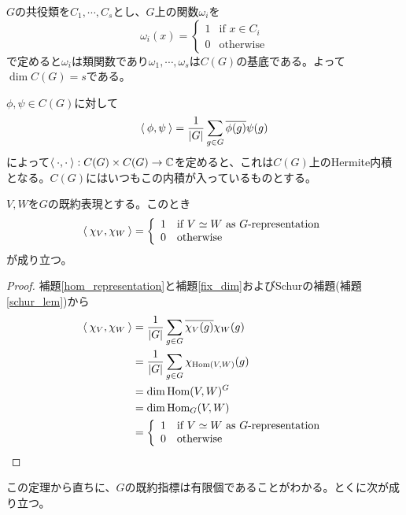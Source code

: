 \documentclass{ltjsreport}
\begin{document}
\begin{eg}
  $G$の共役類を$C_1,\cdots,C_s$とし、$G$上の関数$\omega_i$を
  \[
  \omega_i(x)=\left\{\begin{array}{cl}
    1 & \text{if $x\in C_i$}\\
    0 & \text{otherwise}
  \end{array}\right.  
  \]
  で定めると$\omega_i$は類関数であり$\omega_1,\cdots,\omega_s$は$C(G)$の基底である。よって$\dim C(G)=s$である。
\end{eg}

\begin{defin}
  $\phi,\psi\in C(G)$に対して
  \[
  \langle\:\phi,\psi\:\rangle=\frac{1}{|G|}\sum_{g\in G}\overline{\phi(g)}\psi(g)  
  \]
  によって$\langle\:\cdot,\cdot\:\rangle:C(G)\times C(G)\rightarrow \mathbb{C}$を定めると、これは$C(G)$上のHermite内積となる。$C(G)$にはいつもこの内積が入っているものとする。
\end{defin}

\begin{theo}[指標の直交関係]\label{char_orthogonality}
  $V,W$を$G$の既約表現とする。このとき
  \[
  \langle\:\chi_V,\chi_W\:\rangle=\left\{\begin{array}{cl}
    1 & \text{if $V\simeq W$ as $G$-representation}\\
    0 & \text{otherwise}
  \end{array}\right.  
  \]
  が成り立つ。
\end{theo}

\begin{proof}
  補題\ref{hom_representation}と補題\ref{fix_dim}およびSchurの補題(補題\ref{schur_lem})から
  \begin{align*}
    \langle\:\chi_V,\chi_W\:\rangle&=\frac{1}{|G|}\sum_{g\in G}\overline{\chi_V(g)}\chi_W(g)\\
    &=\frac{1}{|G|}\sum_{g\in G}\chi_{\text{Hom}(V,W)}(g)\\
    &=\dim \text{Hom}(V,W)^G\\
    &=\dim \text{Hom}_G(V,W)\\
    &=\left\{\begin{array}{cl}
      1 & \text{if $V\simeq W$ as $G$-representation}\\
      0 & \text{otherwise}
    \end{array}\right.  
  \end{align*}
\end{proof}

この定理から直ちに、$G$の既約指標は有限個であることがわかる。とくに次が成り立つ。
\end{document}
